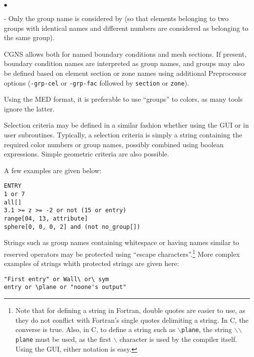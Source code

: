 {{{\begin{list}{$\bullet$}{}
\begin{list}{-}{}
            Only the group name is considered by \CS (so that elements
            belonging to two groups with identical names and different
            numbers are considered as belonging to the same group).
      \item CGNS allows both for named boundary conditions and mesh
            sections. If present, boundary condition names are
            interpreted as group names, and groups may also be defined
            based on element section or zone names using additional
            Preprocessor options (\texttt{-grp-cel} or
            \texttt{-grp-fac} followed by \texttt{section} or
            \texttt{zone}).
      \item Using the MED format, it is preferable to use ``groups''
            to colors, as many tools ignore the latter.
      \end{list}
\end{list}

Selection criteria may be defined in a similar fashion whether
using the GUI or in user subroutines.
Typically, a selection criteria is simply a string containing
the required color numbers or group names, possibly combined
using boolean expressions. Simple geometric criteria are also
possible.

A few examples are given below:

\verb+ENTRY+\\
\verb+1 or 7+\\
\verb+all[]+\\
\verb+3.1 >= z >= -2 or not (15 or entry)+\\
\verb+range[04, 13, attribute]+\\
\verb+sphere[0, 0, 0, 2] and (not no_group[])+

Strings such as group names containing whitespace
or having names similar to reserved operators may be protected
using ``escape characters''.\footnote{Note that for defining a
string in Fortran, double quotes are easier to use, as they do not
conflict with Fortran's single quotes delimiting a string.
In C, the converse is true. Also, in C, to define a string
such as \texttt{{$\backslash$}plane}, the string
\texttt{{$\backslash$}{$\backslash$}plane} must be
used, as the first $\backslash$ character is used by the
compiler itself. Using the GUI, either notation is easy.}
More complex examples of strings whith protected strings are given here:

\verb+"First entry" or Wall\ or\ sym+\\
\verb+entry or \plane or "noone's output"+

}}}
